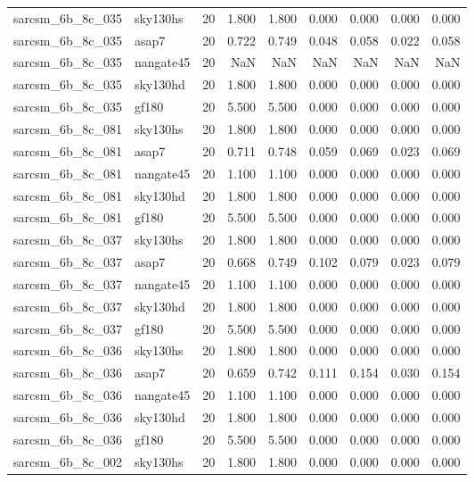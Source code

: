 \begin{tabular}{llrrrrrrr}
sarcsm\_6b\_8c\_035 & sky130hs & 20 & 1.800 & 1.800 & 0.000 & 0.000 & 0.000 & 0.000 \\
sarcsm\_6b\_8c\_035 & asap7 & 20 & 0.722 & 0.749 & 0.048 & 0.058 & 0.022 & 0.058 \\
sarcsm\_6b\_8c\_035 & nangate45 & 20 & NaN & NaN & NaN & NaN & NaN & NaN \\
sarcsm\_6b\_8c\_035 & sky130hd & 20 & 1.800 & 1.800 & 0.000 & 0.000 & 0.000 & 0.000 \\
sarcsm\_6b\_8c\_035 & gf180 & 20 & 5.500 & 5.500 & 0.000 & 0.000 & 0.000 & 0.000 \\
sarcsm\_6b\_8c\_081 & sky130hs & 20 & 1.800 & 1.800 & 0.000 & 0.000 & 0.000 & 0.000 \\
sarcsm\_6b\_8c\_081 & asap7 & 20 & 0.711 & 0.748 & 0.059 & 0.069 & 0.023 & 0.069 \\
sarcsm\_6b\_8c\_081 & nangate45 & 20 & 1.100 & 1.100 & 0.000 & 0.000 & 0.000 & 0.000 \\
sarcsm\_6b\_8c\_081 & sky130hd & 20 & 1.800 & 1.800 & 0.000 & 0.000 & 0.000 & 0.000 \\
sarcsm\_6b\_8c\_081 & gf180 & 20 & 5.500 & 5.500 & 0.000 & 0.000 & 0.000 & 0.000 \\
sarcsm\_6b\_8c\_037 & sky130hs & 20 & 1.800 & 1.800 & 0.000 & 0.000 & 0.000 & 0.000 \\
sarcsm\_6b\_8c\_037 & asap7 & 20 & 0.668 & 0.749 & 0.102 & 0.079 & 0.023 & 0.079 \\
sarcsm\_6b\_8c\_037 & nangate45 & 20 & 1.100 & 1.100 & 0.000 & 0.000 & 0.000 & 0.000 \\
sarcsm\_6b\_8c\_037 & sky130hd & 20 & 1.800 & 1.800 & 0.000 & 0.000 & 0.000 & 0.000 \\
sarcsm\_6b\_8c\_037 & gf180 & 20 & 5.500 & 5.500 & 0.000 & 0.000 & 0.000 & 0.000 \\
sarcsm\_6b\_8c\_036 & sky130hs & 20 & 1.800 & 1.800 & 0.000 & 0.000 & 0.000 & 0.000 \\
sarcsm\_6b\_8c\_036 & asap7 & 20 & 0.659 & 0.742 & 0.111 & 0.154 & 0.030 & 0.154 \\
sarcsm\_6b\_8c\_036 & nangate45 & 20 & 1.100 & 1.100 & 0.000 & 0.000 & 0.000 & 0.000 \\
sarcsm\_6b\_8c\_036 & sky130hd & 20 & 1.800 & 1.800 & 0.000 & 0.000 & 0.000 & 0.000 \\
sarcsm\_6b\_8c\_036 & gf180 & 20 & 5.500 & 5.500 & 0.000 & 0.000 & 0.000 & 0.000 \\
sarcsm\_6b\_8c\_002 & sky130hs & 20 & 1.800 & 1.800 & 0.000 & 0.000 & 0.000 & 0.000 \\

\end{tabular}
